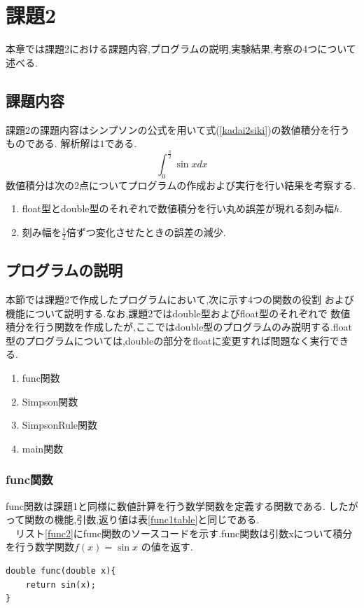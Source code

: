 \documentclass[dvipdfmx]{jarticle}
\begin{document}
    \section{課題2}
    本章では課題2における課題内容,プログラムの説明,実験結果,考察の4つについて述べる.
    \subsection{課題内容}
    課題2の課題内容はシンプソンの公式を用いて式(\ref{kadai2siki})の数値積分を行うものである.
    解析解は$1$である.
    \begin{equation}
      \int_0^\frac{\pi}{2} \sin x dx
          \label{kadai2siki}
        \end{equation}
    数値積分は次の2点についてプログラムの作成および実行を行い結果を考察する.
    \begin{enumerate}
      \item float型とdouble型のそれぞれで数値積分を行い丸め誤差が現れる刻み幅$h$.
      \item 刻み幅を$\frac{1}{2}$倍ずつ変化させたときの誤差の減少.
      \end{enumerate}

    \subsection{プログラムの説明}
    本節では課題2で作成したプログラムにおいて,次に示す4つの関数の役割
    および機能について説明する.なお,課題2ではdouble型およびfloat型のそれぞれで
    数値積分を行う関数を作成したが,ここではdouble型のプログラムのみ説明する.float
    型のプログラムについては,doubleの部分をfloatに変更すれば問題なく実行できる.
    \begin{enumerate}
      \item func関数
      \item Simpson関数
      \item SimpsonRule関数
      \item main関数
      \end{enumerate}
    
    \subsubsection{func関数}
    func関数は課題1と同様に数値計算を行う数学関数を定義する関数である.
    したがって関数の機能,引数,返り値は表\ref{func1table}と同じである.\\
    　リスト\ref{func2}にfunc関数のソースコードを示す.func関数は引数xについて積分を行う数学関数$f(x)=\sin x$
      の値を返す.
      \begin{lstlisting}[basicstyle=\ttfamily\footnotesize, frame=single,label=func2,caption=func関数]
double func(double x){
    return sin(x);
} 
            \end{lstlisting}
\end{document}
